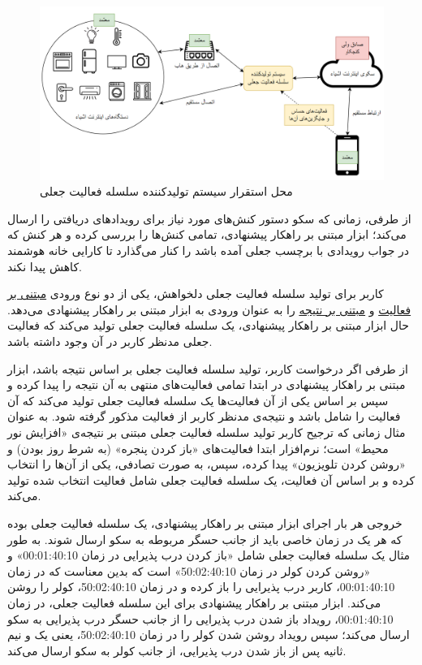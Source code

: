 \begin{figure}[htp]
\centerline{\includegraphics[width=1\textwidth]{figs/fxyz.png}}
\caption{محل استقرار سیستم تولیدکننده سلسله فعالیت جعلی}
\label{fig:fxyz}
\end{figure}

از طرفی، زمانی که سکو دستور کنش‌های مورد نیاز برای رویدادهای دریافتی را ارسال می‌کند؛ ابزار مبتنی بر راهکار پیشنهادی، تمامی کنش‌ها را بررسی کرده و هر کنش که در جواب رویدادی با برچسب جعلی آمده باشد را کنار می‌گذارد تا کارایی خانه هوشمند کاهش پیدا نکند.

کاربر برای تولید سلسله فعالیت جعلی دلخواهش، یکی از دو نوع ورودی \underline{مبتنی بر فعالیت} و \underline{مبتنی بر نتیجه} را به عنوان ورودی به ابزار مبتنی بر راهکار پیشنهادی می‌دهد. حال ابزار مبتنی بر راهکار پیشنهادی، یک سلسله فعالیت جعلی تولید می‌کند که فعالیت جعلی مدنظر کاربر در آن وجود داشته باشد.

از طرفی اگر درخواست کاربر، تولید سلسله فعالیت جعلی بر اساس نتیجه باشد، ابزار مبتنی بر راهکار پیشنهادی در ابتدا تمامی فعالیت‌های منتهی به آن نتیجه را پیدا کرده و سپس بر اساس یکی از آن فعالیت‌ها یک سلسله فعالیت جعلی تولید می‌کند که آن فعالیت را شامل باشد و نتیجه‌ی مدنظر کاربر از فعالیت مذکور گرفته شود. به عنوان مثال زمانی که ترجیح کاربر تولید سلسله فعالیت جعلی مبتنی بر نتیجه‌ی «افزایش نور محیط» است؛ نرم‌افزار ابتدا فعالیت‌های «باز کردن پنجره» (به شرط روز بودن) و «روشن کردن تلویزیون» پیدا کرده، سپس، به صورت تصادفی، یکی از آن‌ها را انتخاب کرده و بر اساس آن فعالیت، یک سلسله فعالیت جعلی شامل فعالیت انتخاب شده تولید می‌کند.

خروجی هر بار اجرای ابزار مبتنی بر راهکار پیشنهادی، یک سلسله فعالیت جعلی بوده که هر یک در زمان خاصی باید از جانب حسگر مربوطه به سکو ارسال شوند. به طور مثال یک سلسله فعالیت جعلی شامل «باز کردن درب پذیرایی در زمان 00:01:40:10» و «روشن کردن کولر در زمان 50:02:40:10» است که بدین معناست که در زمان 00:01:40:10، کاربر درب پذیرایی را باز کرده و در زمان 50:02:40:10، کولر را روشن می‌کند. ابزار مبتنی بر راهکار پیشنهادی برای این سلسله فعالیت جعلی، در زمان 00:01:40:10، رویداد باز شدن درب پذیرایی را از جانب حسگر درب پذیرایی به سکو ارسال می‌کند؛ سپس رویداد روشن شدن کولر را در زمان 50:02:40:10، یعنی یک و نیم ثانیه پس از باز شدن درب پذیرایی، از جانب کولر به سکو ارسال می‌کند.

